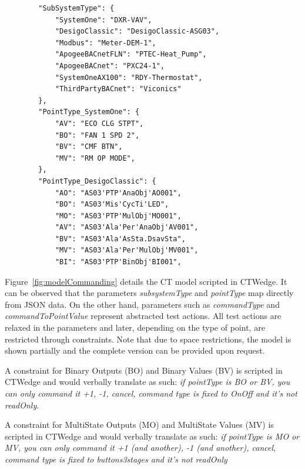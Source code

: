 \documentclass[conference]{IEEEtran}
\begin{document}
	\begin{lstlisting}
		"SubSystemType": {
			"SystemOne": "DXR-VAV",
			"DesigoClassic": "DesigoClassic-ASG03",
			"Modbus": "Meter-DEM-1",
			"ApogeeBACnetFLN": "PTEC-Heat_Pump",
			"ApogeeBACnet": "PXC24-1",
			"SystemOneAX100": "RDY-Thermostat",
			"ThirdPartyBACnet": "Viconics"
		},
		"PointType_SystemOne": {
			"AV": "ECO CLG STPT",
			"BO": "FAN 1 SPD 2",
			"BV": "CMF BTN",
			"MV": "RM OP MODE",
		},
		"PointType_DesigoClassic": {
			"AO": "AS03'PTP'AnaObj'AO001",
			"BO": "AS03'Mis'CycTi'LED",
			"MO": "AS03'PTP'MulObj'MO001",
			"AV": "AS03'Ala'Per'AnaObj'AV001",
			"BV": "AS03'Ala'AsSta.DsavSta",
			"MV": "AS03'Ala'Per'MulObj'MV001",
			"BI": "AS03'PTP'BinObj'BI001",	
	\end{lstlisting}
	
	Figure~\ref{fig:modelCommanding} details the CT model scripted in CTWedge.
	It can be observed that the parameters \textit{subsystemType} and \textit{pointType} map directly from JSON data.
	On the other hand, parameters such as \textit{commandType} and \textit{commandToPointValue} represent abstracted test actions.
	All test actions are relaxed in the parameters and later, depending on the type of point, are restricted through constraints.
	Note that due to space restrictions, the model is shown partially and the complete version can be provided upon request.
	
	A constraint for Binary Outputs (BO) and Binary Values (BV) is scripted in CTWedge and would verbally translate as such:
	\textit{if pointType is BO or BV, you can only command it +1, -1, cancel, command type is fixed to OnOff and it's not readOnly}.
	
	A constraint for MultiState Outputs (MO) and MultiState Values (MV) is scripted in CTWedge and would verbally translate as such:
	\textit{if pointType is MO or MV, you can only command it +1 (and another), -1 (and another), cancel, command type is fixed to buttons3stages and it's not readOnly}
\end{document}

